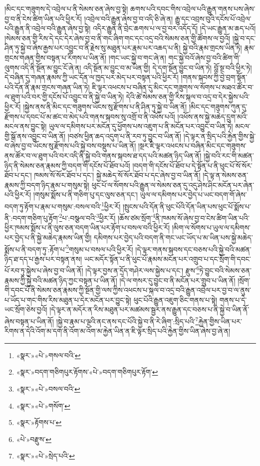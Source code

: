 །མིང་དང་གཟུགས་དེ་འབྲེལ་པ་ནི་སེམས་ཅན་ཞེས་བྱ་སྟེ། ཆགས་པའི་དབང་གིས་འབྲེལ་པའི་རྒྱུན་གནས་པས་ཞེས་བྱ་བ་ནི་ངེས་ཚིག་ཡིན་པའི་ཕྱིར་རོ། །འབྲེལ་བའི་རྒྱུན་ཞེས་བྱ་བ་འདི་ཅི་ཞེ་ན། རྒྱུ་དང་འབྲས་བུའི་དངོས་པོ་འབྲེལ་པའི་རྒྱུན་ནི་འབྲེལ་བའི་རྒྱུན་ཞེས་བྱ་སྟེ། འདིར་རྒྱུན་ནི་བྲེང་ཆགས་པ་ལ་བྱ་བར་འདོད་དོ། །དེ་ཡང་རྒྱུན་མ་ཆད་པའོ། །སེམས་ཅན་གྱི་རིས་དེ་དང་དེར་ཞེས་བྱ་བ་ནི་གང་ཞིག་གང་དང་འདྲ་བའི་སེམས་ཅན་གྱི་ཚོགས་ལ་བྱའོ། །སྐྱེ་བ་དང་ཤིན་ཏུ་སྐྱེ་བ་ཞེས་རྒྱས་པར་འབྱུང་བ་ནི་རྗེས་སུ་མཐུན་པར་རྣམ་པར་འཆད་པ་ནི། སྐྱེ་བའི་རྣམ་གྲངས་ཡིན་ཏེ། རྣམ་གྲངས་གཞན་གྱིས་བསྟན་པ་རིགས་པ་ཡིན་ནོ། །གང་ཡང་སྐྱེ་བ་གང་ཞེ་ན། གང་སྐྱེ་བའོ་ཞེས་བྱ་བའི་ཚིག་གི་ལུགས་འདི་ནི་སྔོན་མ་བྱུང་ངོ་ཞེ་ན། འདི་སྔོན་མ་བྱུང་བ་མ་ཡིན་གྱི། དེ་དག་སྔོན་བྱུང་བ་ཡིན་ཏེ། བློ་སྔ་བའི་ཕྱིར་ཏེ། དེ་བཞིན་དུ་གཞན་རྣམས་ཀྱི་ཡང་དོན་ལ་ཁྱད་པར་མེད་པར་བསྟན་པའི་ཕྱིར་རོ། །གནས་སྐབས་ཀྱི་བྱེ་བྲག་སྟོན་པའི་དོན་ནི་རྣམ་གྲངས་གཞན་ཡིན་ཏེ། ཇི་ལྟར་འཕངས་པ་བཞིན་དུ་མིང་དང་གཟུགས་ལ་སོགས་པ་མཐའ་ཚོར་བ་ལ་ཐུག་པའི་བར་གྱི་དངོས་པོ་འབྱུང་བ་ནི་སྐྱེ་བ་ཡིན་ཏེ། དེའི་ཚེ་སེམས་ཅན་གྱི་རིས་སྐལ་བ་འདྲ་བ་དེར་སྐྱེས་པའི་ཕྱིར་རོ། །སྐྱེས་ནས་ནི་མིང་དང་གཟུགས་ཡོངས་སུ་རྫོགས་པ་ནི་ཤིན་ཏུ་སྐྱེ་བ་ཡིན་ནོ། །མིང་དང་གཟུགས་ཀུན་དུ་རྫོགས་པ་དབང་པོ་མ་ཚང་བ་མེད་པའི་གནས་སྐབས་སུ་འགྲོ་བ་ནི་འཕོས་པའོ། །འཕོས་ནས་སྐྱེ་མཆེད་དྲུག་མའི་མངལ་ནས་བྱུང་སྟེ། ཡུལ་ལ་དམིགས་པར་མངོན་དུ་ཕྱོགས་པས་འཇུག་པ་ནི་མངོན་པར་འབྱུང་བ་ཡིན་ཏེ། མངལ་གྱི་སྒོ་ནས་འབྱུང་བ་ཡིན་ནོ། །བཙས་ཕྱིན་ཆད་འདུག་པ་ནི་རབ་ཏུ་བྱུང་བ་ཡིན་ནོ། །དེ་ལྟར་ན་སྲིད་པའི་རྐྱེན་གྱིས་སྐྱེ་བ་ཞེས་བྱ་བ་ཡོངས་སུ་རྫོགས་པའི་སྐྱེ་བས་བསྡུས་པ་ཡིན་ནོ། །སྔར་ཇི་ལྟར་འཕངས་པ་བཞིན་མིང་དང་གཟུགས་ནས་ཚོར་བ་ལ་ཐུག་པའི་བར་འདི་ནི་སྐྱེ་བའི་གནས་སྐབས་ཐ་དད་པའི་མཚན་ཉིད་ཡིན་ནོ། །སྐྱེ་བའི་རང་གི་མཚན་ཉིད་ནི་སེམས་ཅན་རྣམས་ཀྱི་བདག་གི་དངོས་པོ་ཐོབ་པའོ། །བདག་གི་དངོས་པོ་ཐོབ་པ་དེ་སྟོན་པ་ནི་ཕུང་པོ་སོ་སོར་ཐོབ་པ་དང་། ཁམས་སོ་སོར་ཐོབ་པ་དང་། སྐྱེ་མཆེད་སོ་སོར་ཐོབ་པ་དང་ཞེས་བྱ་བ་ཡིན་ནོ། །དེ་ལྟ་ན་སེམས་ཅན་རྣམས་ཀྱི་བདག་ཉིད་རྣམ་པ་གསུམ་སྟེ། ཕུང་པོ་ལ་སོགས་པའི་རྒྱུན་ལ་སེམས་ཅན་དུ་འདུ་ཤེས་ཤིང་མངོན་པར་ཞེན་པའི་ཕྱིར་རོ། །གསུམ་སྨོས་པ་ནི་གཅིག་པུ་དང་ལུས་ཅན་དང་། ཡུལ་ལ་དམིགས་པར་བྱེད་པ་ཡང་བདག་གོ་ཞེས་བདག་ཏུ་རྟོག་པ་རྣམ་པ་གསུམ་:བསལ་བའི་\footnote{«སྣར་»«པེ་»གསལ་བའི་}ཕྱིར་རོ། །སྤུངས་པའི་དོན་ནི་ཕུང་པོའི་དོན་ཡིན་པས་ཕུང་པོ་སྨོས་པ་ནི་:བདག་གཅིག་པུ་རྟོག་\footnote{«སྣར་»བདག་གཅིགཔུར་རྟོགས་«པེ་»བདག་གཅིགཔུར་རྟོག་}པ་:བསྩལ་བའི་\footnote{«སྣར་»«པེ་»བསལ་བའི་}ཕྱིར་རོ། །ཆོས་ཙམ་སྲོག་\footnote{«སྣར་»«པེ་»གསོག་}ནི་ཁམས་སོ་ཞེས་བྱ་བ་ངེས་ཚིག་ཡིན་པའི་ཕྱིར་ཁམས་སྨོས་པ་ནི་ལུས་ཅན་བདག་ཡིན་པར་རྟོག་པ་བསལ་བའི་ཕྱིར་རོ། །མིག་ལ་སོགས་པ་ཡུལ་ལ་དམིགས་པར་བྱེད་པ་ནི་སྐྱེ་མཆེད་རྣམས་ཡིན་གྱི། དམིགས་པར་བྱེད་པའི་བདག་ནི་གང་ཡང་ཡོད་པ་མ་ཡིན་པས་སྐྱེ་མཆེད་སྨོས་པ་ནི་བདག་ཏུ་:རྟོག་པ་\footnote{«སྣར་»རྟོགས་པ་}གསུམ་པ་བསལ་པའི་ཕྱིར་རོ། །དེ་ལྟར་གནས་སྐབས་དང་བཅས་པའི་སྐྱེ་བའི་མཚན་ཉིད་ཐ་དད་པ་རྒྱས་པར་བསྟན་ནས། ཡང་མདོར་སྟོན་པ་ནི་ཕུང་པོ་རྣམས་མངོན་པར་འགྲུབ་པ་དང་སྲོག་གི་དབང་པོ་རབ་ཏུ་སྐྱེས་པ་ཞེས་བྱ་བ་ཡིན་ནོ། །དེ་ལྟར་བྱས་ན་དྲོད་གཤེར་ལས་སྐྱེས་པ་དང་། རྫུས་\footnote{«པེ་»བརྫུས་}ཏེ་བྱུང་བའི་སེམས་ཅན་རྣམས་ཀྱི་སྐྱེ་བའི་མཚན་ཉིད་ཀྱང་བསྟན་པ་ཡིན་ནོ། །དེ་ལ་གསར་དུ་བྱུང་བ་ནི་མངོན་པར་གྲུབ་པ་ཡིན་ནོ། །སྲོག་གི་དབང་པོ་ནི་སེམས་ཅན་རྣམས་ཀྱི་སྔོན་གྱི་ལས་ཀྱིས་འཕངས་པ་སྐལ་བ་འདྲ་བའི་རྒྱུན་འབྲེལ་པར་བྱ་བ་ལ་ནུས་པ་ཡོད་པ་གང་གིས་རིས་མཐུན་པ་དེར་མངོན་པར་བྱུང་སྟེ། ཕུང་པོའི་རྒྱུན་འཇུག་ཅིང་གནས་པ་སྟེ། གནས་པ་དེ་ཡང་སྲོག་ཅེས་བྱའོ། །དེ་ལྟར་ན་མདོར་ན་རིས་མཐུན་པར་མཚམས་སྦྱར་ནས་རྒྱུན་དང་བཅས་པ་ནི་སྐྱེ་བ་ཡིན་ནོ་ཞེས་བསྟན་པ་ཡིན་ནོ། །སྐྱེ་བ་རྣམ་པ་ལྔའི་ནང་ནས་དང་པོའི་སྐྱེ་བ་ནི་རེ་ཞིག་:སྲིད་པའི་\footnote{«སྣར་»«པེ་»སྲེད་པའི་}རྐྱེན་གྱིས་ཡིན་པར་རིགས་ན་དེའི་འོག་མ་དག་ནི་འོག་མ་འོག་མ་རྐྱེན་ཡིན་ན་ཇི་ལྟར་སྲིད་པའི་རྐྱེན་གྱིས་ཡིན་ཞེས་བྱ་ཞེ་ན། 